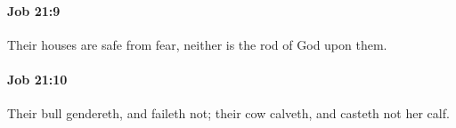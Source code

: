 		\paragraph{Job 21:9} %
			\label{JOB-21-9}

			Their houses are safe from fear, neither is the rod of God upon them.


		\paragraph{Job 21:10} %
			\label{JOB-21-10}

			Their bull gendereth, and faileth not; their cow calveth, and casteth not her calf.


